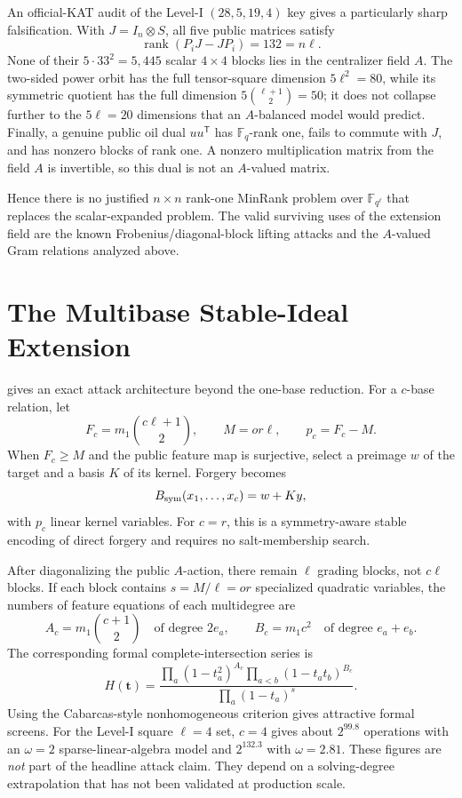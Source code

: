 \documentclass[11pt]{article}
\newcommand{\F}{\mathbb F}
\newcommand{\rank}{\operatorname{rank}}
\newcommand{\transpose}{\mathsf T}
\begin{document}
An official-KAT audit of the Level-I $(28,5,19,4)$ key gives a particularly
sharp falsification.  With $J=I_n\otimes S$, all five public matrices satisfy
\[
 \rank(P_iJ-JP_i)=132=n\ell.
\]
None of their $5\cdot33^2=5{,}445$ scalar $4\times4$ blocks lies in the
centralizer field $A$.  The two-sided power orbit has the full tensor-square
dimension $5\ell^2=80$, while its symmetric quotient has the full dimension
$5\binom{\ell+1}{2}=50$; it does not collapse further to the
$5\ell=20$ dimensions that an $A$-balanced model would predict.  Finally, a
genuine public oil dual $uu^\transpose$ has $\F_q$-rank one, fails to commute
with $J$, and has nonzero blocks of rank one.  A nonzero multiplication matrix
from the field $A$ is invertible, so this dual is not an $A$-valued matrix.

Hence there is no justified $n\times n$ rank-one MinRank problem over
$\F_{q^\ell}$ that replaces the scalar-expanded problem.  The valid surviving
uses of the extension field are the known Frobenius/diagonal-block lifting
attacks and the $A$-valued Gram relations analyzed above.

\section{The Multibase Stable-Ideal Extension}\label{app:multibase}

 gives an exact attack architecture beyond the one-base
reduction.  For a $c$-base relation, let
\[
 F_c=m_1\binom{c\ell+1}{2},\qquad M=or\ell,
 \qquad p_c=F_c-M.
\]
When $F_c\ge M$ and the public feature map is surjective, select a preimage
$w$ of the target and a basis $K$ of its kernel.  Forgery becomes
\begin{equation}\label{eq:lifted-multibase}
 B_{\rm sym}(x_1,\ldots,x_c)=w+Ky,
\end{equation}
with $p_c$ linear kernel variables.  For $c=r$, this is a symmetry-aware
stable encoding of direct forgery and requires no salt-membership search.

After diagonalizing the public $A$-action, there remain $\ell$ grading blocks,
not $c\ell$ blocks.  If each block contains $s=M/\ell=or$ specialized
quadratic variables, the numbers of feature equations of each multidegree are
\[
 A_c=m_1\binom{c+1}{2}
 \quad\text{of degree }2e_a,
 \qquad
 B_c=m_1c^2
 \quad\text{of degree }e_a+e_b.
\]
The corresponding formal complete-intersection series is
\[
 H(\mathbf t)=
 \frac{\prod_a(1-t_a^2)^{A_c}
       \prod_{a<b}(1-t_at_b)^{B_c}}
      {\prod_a(1-t_a)^s}.
\]
Using the Cabarcas-style nonhomogeneous criterion gives attractive formal
screens.  For the Level-I square $\ell=4$ set, $c=4$ gives about
$2^{99.8}$ operations with an $\omega=2$ sparse-linear-algebra model and
$2^{132.3}$ with $\omega=2.81$.  These figures are \emph{not} part of the
headline attack claim.  They depend on a solving-degree extrapolation that has
not been validated at production scale.
\end{document}
